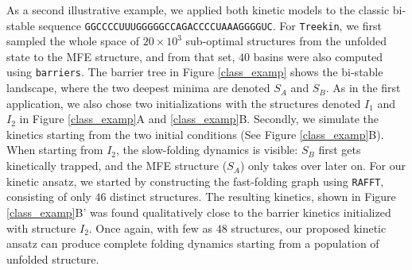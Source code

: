 As a second illustrative example, we applied both kinetic models to the classic bi-stable sequence \texttt{GGCCCCUUUGGGGGCCAGACCCCUAAAGGGGUC}. For \texttt{Treekin}, we first sampled the whole space of \(20 \times 10^3\) sub-optimal structures from the unfolded state to the MFE structure, and from that set, $40$ basins were also computed using \texttt{barriers}. The barrier tree in Figure \ref{class_examp} shows the bi-stable landscape, where the two deepest minima are denoted $S_A$ and $S_B$. As in the first application, we also chose two initializations with the structures denoted $I_1$ and $I_2$ in Figure \ref{class_examp}A and \ref{class_examp}B. Secondly, we simulate the kinetics starting from the two initial conditions (See Figure \ref{class_examp}B). When starting from $I_2$, the slow-folding dynamics is visible:  $S_B$ first gets kinetically trapped, and the MFE structure ($S_A$) only takes over later on. For our kinetic ansatz, we started by constructing the fast-folding graph using \texttt{RAFFT}, consisting of only $46$ distinct structures. The resulting kinetics, shown in Figure \ref{class_examp}B' was found qualitatively close to the barrier kinetics initialized with structure $I_2$. Once again, with few as $48$ structures, our proposed kinetic ansatz can produce complete folding dynamics starting from a population of unfolded structure.

